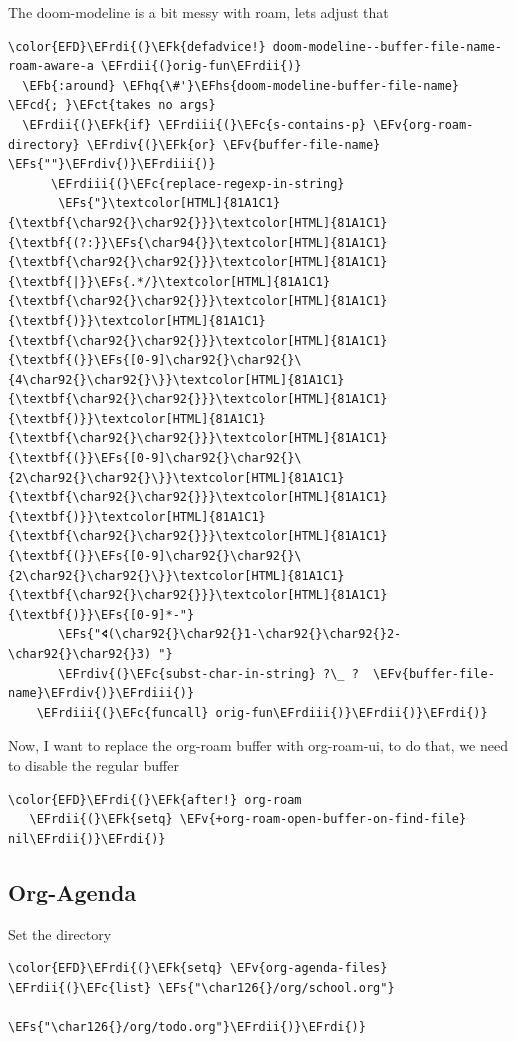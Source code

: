 \documentclass{scrartcl}
\newcommand{\EFk}[1]{\textcolor{EFk}{#1}} %
\newcommand{\EFs}[1]{\textcolor{EFs}{#1}} %
\newcommand{\EFb}[1]{\textcolor{EFb}{#1}} %
\newcommand{\EFct}[1]{\textcolor{EFct}{#1}} %
\newcommand{\EFc}[1]{\textcolor{EFc}{#1}} %
\newcommand{\EFv}[1]{\textcolor{EFv}{#1}} %
\newcommand{\EFcd}[1]{\textcolor{EFcd}{#1}} %
\newcommand{\EFhq}[1]{#1} %
\newcommand{\EFhs}[1]{#1} %
\newcommand{\EFrdi}[1]{#1} %
\newcommand{\EFrdii}[1]{#1} %
\newcommand{\EFrdiii}[1]{#1} %
\newcommand{\EFrdiv}[1]{#1} %
\begin{document}
The doom-modeline is a bit messy with roam, lets adjust that
\begin{Code}
\begin{Verbatim}[]
\color{EFD}\EFrdi{(}\EFk{defadvice!} doom-modeline--buffer-file-name-roam-aware-a \EFrdii{(}orig-fun\EFrdii{)}
  \EFb{:around} \EFhq{\#'}\EFhs{doom-modeline-buffer-file-name} \EFcd{; }\EFct{takes no args}
  \EFrdii{(}\EFk{if} \EFrdiii{(}\EFc{s-contains-p} \EFv{org-roam-directory} \EFrdiv{(}\EFk{or} \EFv{buffer-file-name} \EFs{""}\EFrdiv{)}\EFrdiii{)}
      \EFrdiii{(}\EFc{replace-regexp-in-string}
       \EFs{"}\textcolor[HTML]{81A1C1}{\textbf{\char92{}\char92{}}}\textcolor[HTML]{81A1C1}{\textbf{(?:}}\EFs{\char94{}}\textcolor[HTML]{81A1C1}{\textbf{\char92{}\char92{}}}\textcolor[HTML]{81A1C1}{\textbf{|}}\EFs{.*/}\textcolor[HTML]{81A1C1}{\textbf{\char92{}\char92{}}}\textcolor[HTML]{81A1C1}{\textbf{)}}\textcolor[HTML]{81A1C1}{\textbf{\char92{}\char92{}}}\textcolor[HTML]{81A1C1}{\textbf{(}}\EFs{[0-9]\char92{}\char92{}\{4\char92{}\char92{}\}}\textcolor[HTML]{81A1C1}{\textbf{\char92{}\char92{}}}\textcolor[HTML]{81A1C1}{\textbf{)}}\textcolor[HTML]{81A1C1}{\textbf{\char92{}\char92{}}}\textcolor[HTML]{81A1C1}{\textbf{(}}\EFs{[0-9]\char92{}\char92{}\{2\char92{}\char92{}\}}\textcolor[HTML]{81A1C1}{\textbf{\char92{}\char92{}}}\textcolor[HTML]{81A1C1}{\textbf{)}}\textcolor[HTML]{81A1C1}{\textbf{\char92{}\char92{}}}\textcolor[HTML]{81A1C1}{\textbf{(}}\EFs{[0-9]\char92{}\char92{}\{2\char92{}\char92{}\}}\textcolor[HTML]{81A1C1}{\textbf{\char92{}\char92{}}}\textcolor[HTML]{81A1C1}{\textbf{)}}\EFs{[0-9]*-"}
       \EFs{"🢔(\char92{}\char92{}1-\char92{}\char92{}2-\char92{}\char92{}3) "}
       \EFrdiv{(}\EFc{subst-char-in-string} ?\_ ?  \EFv{buffer-file-name}\EFrdiv{)}\EFrdiii{)}
    \EFrdiii{(}\EFc{funcall} orig-fun\EFrdiii{)}\EFrdii{)}\EFrdi{)}
\end{Verbatim}
\end{Code}


Now, I want to replace the org-roam buffer with org-roam-ui, to do that, we need
to disable the regular buffer
\begin{Code}
\begin{Verbatim}[]
\color{EFD}\EFrdi{(}\EFk{after!} org-roam
   \EFrdii{(}\EFk{setq} \EFv{+org-roam-open-buffer-on-find-file} nil\EFrdii{)}\EFrdi{)}
\end{Verbatim}
\end{Code}

\subsection{Org-Agenda}
\label{sec:orgf39f779}
Set the directory
\begin{Code}
\begin{Verbatim}[]
\color{EFD}\EFrdi{(}\EFk{setq} \EFv{org-agenda-files} \EFrdii{(}\EFc{list} \EFs{"\char126{}/org/school.org"}
                             \EFs{"\char126{}/org/todo.org"}\EFrdii{)}\EFrdi{)}
\end{Verbatim}
\end{Code}
\end{document}
